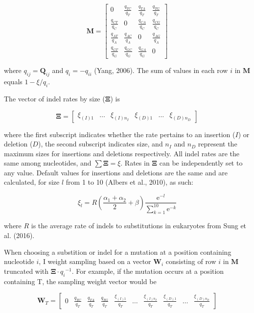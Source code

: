 \documentclass[12pt,]{article}
\begin{document}
\[
\mathbf{M} = 
\begin{bmatrix}
0                  & \frac{q_{TC}}{q_T} & \frac{q_{TA}}{q_T} & \frac{q_{TG}}{q_T} \\
\frac{q_{CT}}{q_C} & 0                  & \frac{q_{CA}}{q_C} & \frac{q_{CG}}{q_C} \\
\frac{q_{AT}}{q_A} & \frac{q_{AC}}{q_A} & 0                  & \frac{q_{AG}}{q_A} \\
\frac{q_{GT}}{q_G} & \frac{q_{GC}}{q_G} & \frac{q_{GA}}{q_G} & 0
\end{bmatrix}
\]

where \(q_{ij} = \mathbf{Q}_{ij}\) and \(q_i = -q_{ii}\) (Yang, 2006).
The sum of values in each row \(i\) in \(\mathbf{M}\) equals
\(1 - \xi / q_i\).

The vector of indel rates by size (\(\mathbf{\Xi}\)) is

\[
\mathbf{\Xi} =
\begin{bmatrix}
    \xi_{(I)1} & \ldots  & \xi_{(I)n_I} & \xi_{(D)1} & \ldots  & \xi_{(D)n_D}
\end{bmatrix}
\]

where the first subscript indicates whether the rate pertains to an
insertion (\(I\)) or deletion (\(D\)), the second subscript indicates
size, and \(n_I\) and \(n_D\) represent the maximum sizes for insertions
and deletions respectively. All indel rates are the same among
nucleotides, and \(\sum\mathbf{\Xi} = \xi\). Rates in \(\mathbf{\Xi}\)
can be independently set to any value. Default values for insertions and
deletions are the same and are calculated, for size \(l\) from 1 to 10
(Albers et al., 2010), as such:

\[
\xi_l = R \left( \frac{\alpha_1 + \alpha_2}{2} + \beta \right)
    \frac{ \text{e}^{-l} }{ \sum^{10}_{k=1}{ \text{e}^{-k} } }
\]

where \(R\) is the average rate of indels to substitutions in eukaryotes
from Sung et al. (2016).

When choosing a substition or indel for a mutation at a position
containing nucleotide \(i\), I weight sampling based on a vector
\(\mathbf{W}_i\) consisting of row \(i\) in \(\mathbf{M}\) truncated
with \(\mathbf{\Xi} \cdot {q_i}^{-1}\). For example, if the mutation
occurs at a position containing T, the sampling weight vector would be

\[
\mathbf{W}_T = 
\begin{bmatrix}
    0 & \frac{q_{TC}}{q_T} & \frac{q_{TA}}{q_T} & \frac{q_{TG}}{q_T} & 
    \frac{\xi_{(I)1}}{q_T} & \ldots  & \frac{\xi_{(I)n_I}}{q_T} & \frac{\xi_{(D)1}}{q_T} & \ldots  & \frac{\xi_{(D)n_D}}{q_T}
\end{bmatrix}
\]
\end{document}
